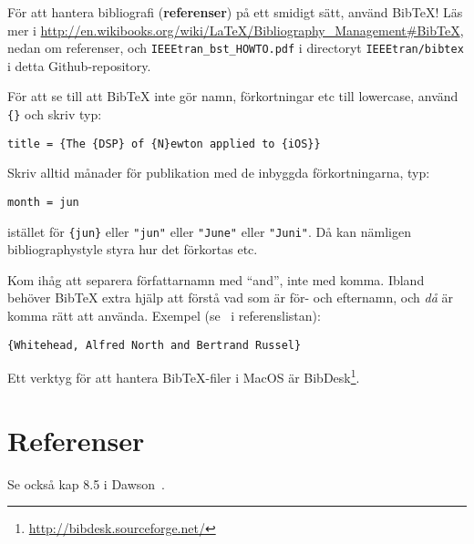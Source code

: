 För att hantera bibliografi (\textbf{referenser}) på ett smidigt sätt, använd BibTeX! Läs mer i \url{http://en.wikibooks.org/wiki/LaTeX/Bibliography_Management#BibTeX}, nedan om referenser, och
\texttt{IEEEtran\_bst\_HOWTO.pdf} i directoryt \texttt{IEEEtran/bibtex} i detta Github-repository.

För att se till att BibTeX inte gör namn, förkortningar etc till lowercase, använd \verb|{}| och skriv typ:
\begin{verbatim}
title = {The {DSP} of {N}ewton applied to {iOS}}
\end{verbatim}

Skriv alltid månader för publikation med de inbyggda förkortningarna, typ:
\begin{verbatim}
month = jun
\end{verbatim}
istället för \verb|{jun}| eller \verb|"jun"| eller \verb|"June"| eller \verb|"Juni"|. Då kan nämligen bibliographystyle styra hur det förkortas etc.

Kom ihåg att separera författarnamn med ``and'', inte med komma. Ibland behöver Bib\TeX{} extra hjälp att förstå vad som är för- och efternamn, och \emph{då} är komma rätt att använda. Exempel (se~\cite{whitehead.russel:principia-mathematica} i referenslistan):
\begin{verbatim}
{Whitehead, Alfred North and Bertrand Russel}
\end{verbatim}

Ett verktyg för att hantera BibTeX-filer i MacOS är BibDesk\footnote{\url{http://bibdesk.sourceforge.net/}}.

\section{Referenser}
\label{sec:referenser}

Se också kap 8.5 i Dawson~\cite{dawson:projects-in-computing}.

\begin{center}
\end{center}

